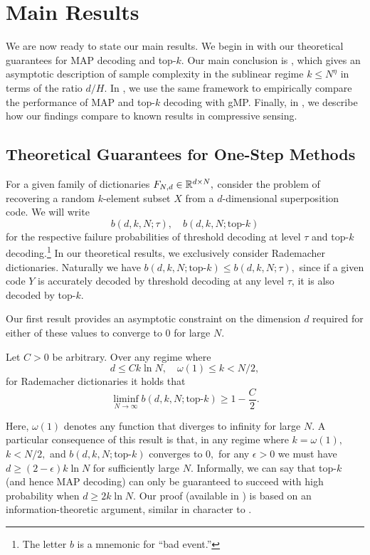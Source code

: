 \section{Main Results \label{sec:main}}

We are now ready to state our main results. We begin in  with our theoretical guarantees for MAP decoding and top-$k$. Our main conclusion is , which gives an asymptotic description of sample complexity in the sublinear regime $k \le N^\eta$ in terms of the ratio $d/H.$ In , we use the same framework to empirically compare the performance of MAP and top-$k$ decoding with gMP. Finally, in , we describe how our findings compare to known results in compressive sensing.

\subsection{Theoretical Guarantees for One-Step Methods} \label{sec:theoretical}

For a given family of dictionaries $F_{N, d} \in \mathbb{R}^{d \times N},$ consider the problem of recovering a random $k$-element subset $X$ from a $d$-dimensional superposition code. We will write
$$
b(d, k, N; \tau), \quad b(d, k, N; \text{top-}k)
$$
for the respective failure probabilities of threshold decoding at level $\tau$ and top-$k$ decoding.\footnote{The letter $b$ is a mnemonic for ``bad event.''} In our theoretical results, we exclusively consider Rademacher dictionaries. Naturally we have $b(d, k, N; \text{top-}k) \le b(d, k, N; \tau),$ since if a given code $Y$ is accurately decoded by threshold decoding at any level $\tau$, it is also decoded by top-$k$.

Our first result provides an asymptotic constraint on the dimension $d$ required for either of these values to converge to $0$ for large $N.$

 \begin{proposition} \label{prop:necessary-cond}
    Let $C > 0$ be arbitrary. Over any regime where
    $$
    d \le C k \ln N, \quad \omega(1) \le k < N/2,
    $$
    for Rademacher dictionaries it holds that
    $$
    \liminf_{N \to \infty} b(d, k, N; \text{top-$k$}) \ge 1 - \frac C 2.
    $$
\end{proposition}

Here, $\omega(1)$ denotes any function that diverges to infinity for large $N.$ A particular consequence of this result is that, in any regime where $k = \omega(1),$ $k < N/2,$ and $b(d, k, N; \text{top-$k$})$ converges to $0,$ for any $\epsilon > 0$ we must have $d \ge (2 - \epsilon) k \ln N$ for sufficiently large $N.$ Informally, we can say that top-$k$ (and hence MAP decoding) can only be guaranteed to succeed with high probability when $d \ge 2 k \ln N.$ Our proof (available in ) is based on an information-theoretic argument, similar in character to .

